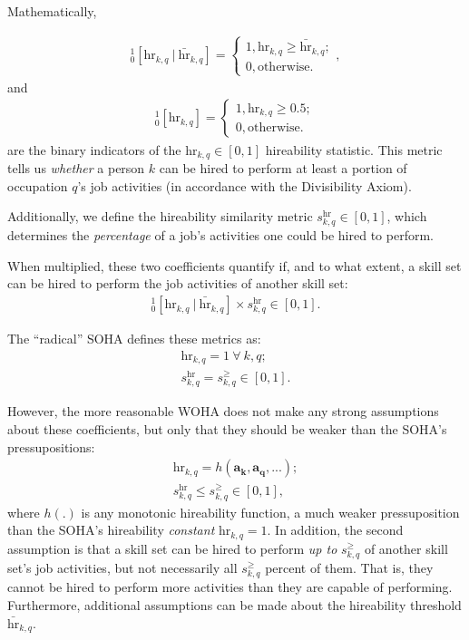 \documentclass{elsarticle} %
\begin{document}
Mathematically,

\begin{gather}
    _{0}^{1}[\text{hr}_{k,q} \ |\ \bar{\text{hr}}_{k,q}] =
    \begin{cases}
        1, \text{$\text{hr}_{k,q} \geq \bar{\text{hr}}_{k,q}$}; \\
        0, \text{otherwise}.
    \end{cases}
    ,
\end{gather}
and
\begin{gather}
    _{0}^{1}[\text{hr}_{k,q}] =
    \begin{cases}
        1, \text{$\text{hr}_{k,q} \geq 0.5$}; \\
        0, \text{otherwise}.
    \end{cases}
\end{gather}
are the binary indicators of the $\text{hr}_{k,q} \in [0,1]$ hireability statistic. This metric tells us \textit{whether} a person $k$ can be hired to perform at least a portion of occupation $q$'s job activities (in accordance with the Divisibility Axiom).

Additionally, we define the hireability similarity metric $s_{k,q}^{\text{hr}}
    \in [0,1]$, which determines the \textit{percentage} of a job's activities one
could be hired to perform.

When multiplied, these two coefficients quantify if, and to what extent, a
skill set can be hired to perform the job activities of another skill set:
\begin{gather}
    _{0}^{1}[\text{hr}_{k,q} \ |\ \bar{\text{hr}}_{k,q}] \times s_{k,q}^{\text{hr}}
    \in [0,1]
    .
\end{gather}

The ``radical'' SOHA defines these metrics as:
\begin{gather}
    \text{hr}_{k,q} = 1 \ \forall \ k,q;\\
    s_{k,q}^{\text{hr}} = s_{k,q}^{\geq}
    \in [0,1]
    .
\end{gather}

However, the more reasonable WOHA does not make any strong assumptions about
these coefficients, but only that they should be weaker than the SOHA's
pressupositions:
\begin{gather}
    \text{hr}_{k,q} = h(\boldsymbol{a_{k}}, \boldsymbol{a_{q}}, ...);\\
    s_{k,q}^{\text{hr}} \leq s_{k,q}^{\geq}
    \in [0,1]
    ,
\end{gather}
where $h(.)$ is any monotonic hireability function, a much weaker pressuposition than the SOHA's hireability \textit{constant} $\text{hr}_{k,q} = 1$. In addition, the second assumption is that a skill set can be hired to perform \textit{up to} $s_{k,q}^{\geq}$ of another skill set's job activities, but not necessarily all $s_{k,q}^{\geq}$ percent of them. That is, they cannot be hired to perform more activities than they are capable of performing. Furthermore, additional assumptions can be made about the hireability threshold $\bar{\text{hr}}_{k,q}$.
\end{document}
